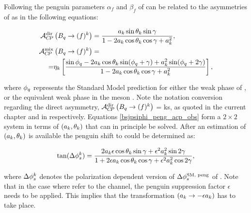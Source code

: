 Following \cite{Faller:2008gt} the penguin parameters $\alpha_f$ and $\beta_f$ of 
can be related to the \CP asymmetries of  as in the following equations:

\begin{subequations}
  \label{bsjpsiphi_peng_acp_obs}
  \begin{align}
    \mathcal{A}_{C\!P}^{\rm dir}&\left( B_q\rightarrow (f)^k \right) = \frac{ a_k \sin\theta_k \sin\gamma} {1 - 2 a_k \cos\theta_k \cos\gamma + a_k^{2}}, \label{bsjpsiphi_peng_acp_dir} \\
    \mathcal{A}_{C\!P}^{\rm mix}&\left( B_q\rightarrow (f)^k \right) = \nonumber \\
    = & \eta_k \left[ \frac{\sin\phi_q - 2a_k \cos\theta_k\sin(\phi_q+\gamma) + a_k^2 \sin(\phi_q+2\gamma)}
                                                                 {1 - 2 a_k \cos\theta_k \cos\gamma + a_k^{2}}  \right], \label{bsjpsiphi_peng_acp_mix}
  \end{align}
\end{subequations}

\noindent where $\phi_q$ represents the Standard Model prediction for either the weak phase \phis of ,
or the equivalent weak phase \phid in the \Bd meson \cite{PDG}. Note the notation conversion regarding the direct \CP
asymmetry, $\mathcal{A}_{C\!P}^{\rm dir}\left(B_q\rightarrow (f)^k\right)$ = \Acp{k}, as quoted in the current chapter and in
 respectively. Equations \ref{bsjpsiphi_peng_acp_obs} form a $2\times2$ system in
terms of $(a_k,\theta_k)$ that can in principle be solved. After an estimation of $(a_k,\theta_k)$ is available the
penguin shift to \phis could be determined as:

\begin{equation}
\centering
\tan(\Delta\phis^k) = \frac{ 2\akPeng\epsilon\cos\thkPeng \sin\gamma + \epsilon^2\akPeng^2 \sin2\gamma}
                             {1 + 2\epsilon\akPeng \cos\thkPeng \cos\gamma + \epsilon^2\akPeng^2 \cos2\gamma},
\label{tandelta}
\end{equation}

\noindent where $\Delta\phi_{s}^k$ denotes the polarization dependent version of $\Delta\phi_{s}^{\tiny\text {SM, peng}}$ of .
Note that in the case where  refer to the \BsJpsiPhi channel, the penguin suppression factor
$\epsilon$ needs to be applied. This implies that the transformation $(a_k\rightarrow-\epsilon a_k)$ has to take place.

